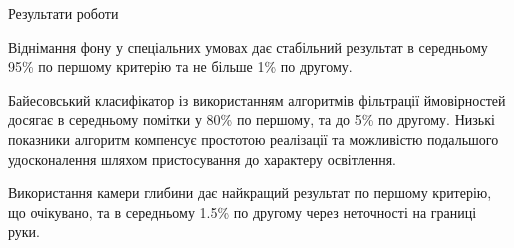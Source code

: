 \begin{frame}{Результати роботи}
	\manimate
	\begin{center}
		Віднімання фону у спеціальних умовах дає стабільний результат в середньому 95\% по першому критерію та не більше 1\% по другому.
		
		Байесовський класифікатор із використанням алгоритмів фільтрації ймовірностей досягає в середньому помітки у 80\% по першому, та до 5\% по другому. Низькі показники алгоритм компенсує простотою реалізації та можливістю подальшого удосконалення шляхом пристосування до характеру освітлення.
		
		Використання камери глибини дає найкращий результат по першому критерію, що очікувано, та в середньому 1.5\% по другому через неточності на границі руки.
	\end{center}
\end{frame}